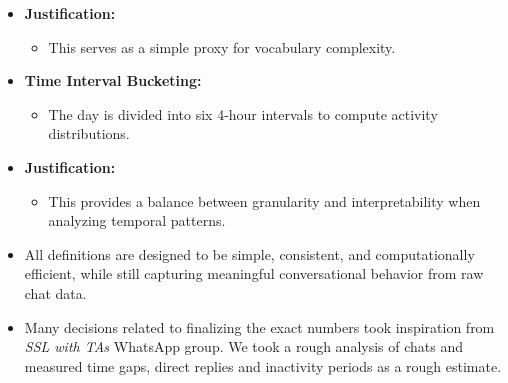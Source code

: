 \documentclass[11pt,a4paper]{article}
\begin{document}
\begin{itemize}
    \item \textbf{Justification:}
    \begin{itemize}
        \item This serves as a simple proxy for vocabulary complexity.
    \end{itemize}

    \item \textbf{Time Interval Bucketing:}
    \begin{itemize}
        \item The day is divided into six 4-hour intervals to compute activity distributions.
    \end{itemize}

    \item \textbf{Justification:}
    \begin{itemize}
        \item This provides a balance between granularity and interpretability when analyzing temporal patterns.
    \end{itemize}

    \item All definitions are designed to be simple, consistent, and computationally efficient, while still capturing meaningful conversational behavior from raw chat data.
    \item Many decisions related to finalizing the exact numbers took inspiration from \emph{SSL with TAs} WhatsApp group. We took a rough analysis of chats and measured time gaps, direct replies and inactivity periods as a rough estimate.
\end{itemize}
\end{document}
